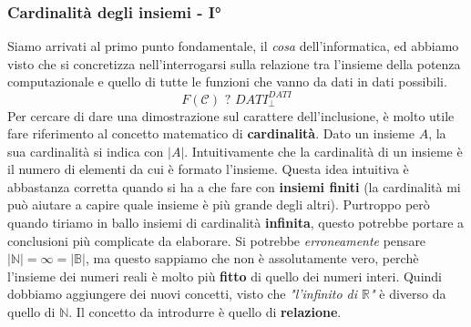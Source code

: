 \documentclass{article}
\begin{document}
\subsubsection{Cardinalità degli insiemi - I°}
Siamo arrivati al primo punto fondamentale, il \textit{cosa} dell'informatica, ed
abbiamo visto che si concretizza nell'interrogarsi sulla relazione tra l'insieme della
potenza computazionale e quello di tutte le funzioni che vanno da dati in dati possibili.
$$F(\mathcal{C})\text{ ? }DATI_{\bot}^{DATI}$$
\newline\newline
Per cercare di dare una dimostrazione sul carattere dell'inclusione, è molto utile
fare riferimento al concetto matematico di \textbf{cardinalità}.
\newline\newline
Dato un insieme $A$, la sua cardinalità si indica con $|A|$. Intuitivamente che la cardinalità
di un insieme è il numero di elementi da cui è formato l'insieme. Questa idea intuitiva
è abbastanza corretta quando si ha a che fare con \textbf{insiemi finiti} (la cardinalità mi può
aiutare a capire quale insieme è più grande degli altri).
\newline\newline
Purtroppo però quando tiriamo in ballo insiemi di cardinalità \textbf{infinita}, questo potrebbe
portare a conclusioni più complicate da elaborare. Si potrebbe \textit{erroneamente}
pensare $|\mathbb{N}|=\infty=|\mathbb{B}|$, ma questo sappiamo che
non è assolutamente vero, perchè l'insieme dei numeri reali è molto più \textbf{fitto}
di quello dei numeri interi.
\newline\newline
Quindi dobbiamo aggiungere dei nuovi concetti, visto che \textit{"l'infinito di $\mathbb{R}$"} è
diverso da quello di $\mathbb{N}$. Il concetto da introdurre è quello di \textbf{relazione}.
\end{document}

